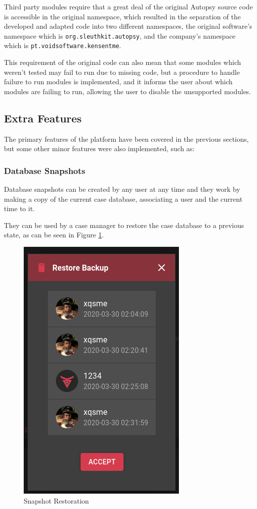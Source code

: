 Third party modules require that a great deal of the original Autopsy source code is accessible in the original namespace, which resulted in the separation of the
developed and adapted code into two different namespaces, the original software's namespace which is \texttt{org.sleuthkit.autopsy}, and the company's namespace which is \texttt{pt.voidsoftware.kensentme}. 

This requirement of the original code can also mean that some modules which weren't tested may fail to run due to missing code, but a procedure to handle failure to run modules is implemented, 
and it informs the user about which modules are failing to run, allowing the user to disable the unsupported modules.

\subsection{Extra Features}

The primary features of the platform have been covered in the previous sections, but some other minor features were also implemented, such as:

\subsubsection*{Database Snapshots}

Database snapshots can be created by any user at any time and they work by making a copy of the current case database, associating a user and the current time to it.

They can be used by a case manager to restore the case database to a previous state, as can be seen in Figure \ref{fig:snapshotrestore}.

\begin{figure}[ht]
 \centering
 \includegraphics[width=0.35\linewidth]{imgs/snapshotrestore.png}
 \caption{Snapshot Restoration}
 \label{fig:snapshotrestore}
\end{figure}

